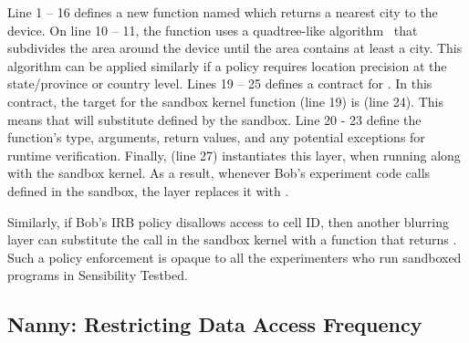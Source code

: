Line 1 -- 16 defines a new function named  which returns 
a nearest city to the device. On line 10 -- 11, the function 
uses a quadtree-like algorithm~\cite{gruteser2003anonymous} that subdivides 
the area around the device until the area contains at least a city.
This algorithm can be applied similarly if a policy requires location 
precision at the state/province or country level.
Lines 19 -- 25 defines a contract for . 
In this contract, the target for the sandbox kernel function 
 (line 19) is  (line 24).
This means that  will substitute  
 defined by the sandbox.
Line 20 - 23 define the function's type, arguments,
return values, and any potential exceptions for runtime verification. 
Finally,  (line 27) instantiates this
 layer, when running along with the sandbox kernel. 
As a result, 
whenever Bob's experiment code calls  defined in the sandbox, 
the  layer replaces it with . 

Similarly, if Bob's IRB policy disallows access to cell ID, then another blurring layer 
can substitute the  call in the sandbox kernel with a function that
returns . %
Such a policy enforcement is opaque to all the experimenters who run 
sandboxed programs in Sensibility Testbed.

\subsection{Nanny: Restricting Data Access Frequency}\label{sec-nanny}


